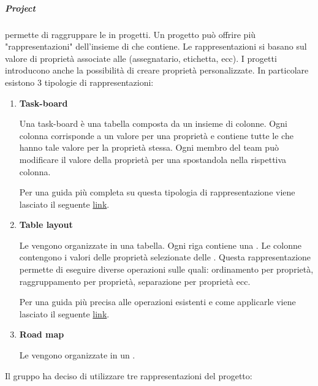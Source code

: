 \subparagraph{Project}
\label{subpar:project}
 permette di raggruppare le  in progetti.
Un progetto può offrire più "rappresentazioni" dell'insieme di  che contiene.
Le rappresentazioni si basano sul valore di proprietà associate alle (assegnatario, etichetta,  ecc).
I progetti introducono anche la possibilità di creare proprietà personalizzate.
In particolare esistono 3 tipologie di rappresentazioni:
\begin{enumerate}
    \item \textbf{Task-board}
    
    Una task-board è una tabella composta da un insieme di colonne.
    Ogni colonna corrisponde a un valore per una proprietà e contiene tutte le  che hanno tale valore per la proprietà stessa.
    Ogni membro del team può modificare il valore della proprietà per una  spostandola nella rispettiva colonna.

    Per una guida più completa su questa tipologia di rappresentazione viene lasciato il seguente \href{https://docs.github.com/en/issues/planning-and-tracking-with-projects/customizing-views-in-your-project/customizing-the-board-layout}{link}.

    \item \textbf{Table layout}
    
    Le  vengono organizzate in una tabella.
    Ogni riga contiene una .
    Le colonne contengono i valori delle proprietà selezionate delle . 
    Questa rappresentazione permette di eseguire diverse operazioni sulle  quali: ordinamento per proprietà, raggruppamento per proprietà, separazione per proprietà ecc.
    
    Per una guida più precisa alle operazioni esistenti e come applicarle viene lasciato il seguente \href{https://docs.github.com/en/issues/planning-and-tracking-with-projects/customizing-views-in-your-project/customizing-the-table-layout}{link}.

    \item \textbf{Road map}
    
    Le  vengono organizzate in un .
\end{enumerate}
Il gruppo ha deciso di utilizzare tre rappresentazioni del progetto:
